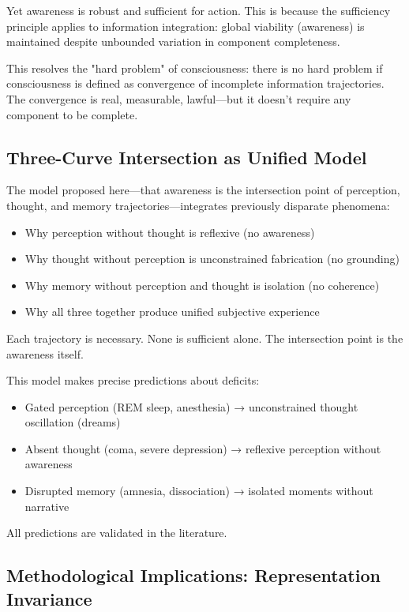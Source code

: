 \documentclass[twocolumn,11pt,a4paper]{article}
\begin{document}
Yet awareness is robust and sufficient for action. This is because the sufficiency principle applies to information integration: global viability (awareness) is maintained despite unbounded variation in component completeness.

This resolves the "hard problem" of consciousness: there is no hard problem if consciousness is defined as convergence of incomplete information trajectories. The convergence is real, measurable, lawful—but it doesn't require any component to be complete.

\subsection{Three-Curve Intersection as Unified Model}

The model proposed here—that awareness is the intersection point of perception, thought, and memory trajectories—integrates previously disparate phenomena:

\begin{itemize}
\item Why perception without thought is reflexive (no awareness)
\item Why thought without perception is unconstrained fabrication (no grounding)
\item Why memory without perception and thought is isolation (no coherence)
\item Why all three together produce unified subjective experience
\end{itemize}

Each trajectory is necessary. None is sufficient alone. The intersection point is the awareness itself.

This model makes precise predictions about deficits:
\begin{itemize}
\item Gated perception (REM sleep, anesthesia) → unconstrained thought oscillation (dreams)
\item Absent thought (coma, severe depression) → reflexive perception without awareness
\item Disrupted memory (amnesia, dissociation) → isolated moments without narrative
\end{itemize}

All predictions are validated in the literature.

\subsection{Methodological Implications: Representation Invariance}
\end{document}
